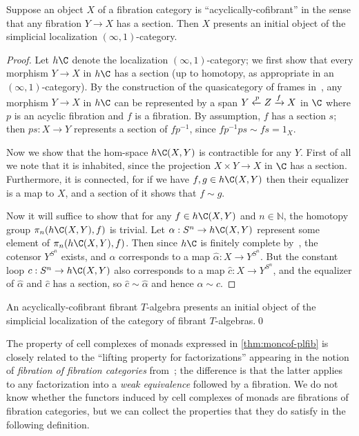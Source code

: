 \documentclass{amsart}
\begin{document}
\begin{lem}
  Suppose an object $X$ of a fibration category is ``acyclically-cofibrant'' in the sense that any fibration $Y\to X$ has a section.
  Then $X$ presents an initial object of the simplicial localization $(\infty,1)$-category.
\end{lem}
\begin{proof}
  Let $h\C$ denote the localization $(\infty,1)$-category; we first show that every morphism $Y\to X$ in $h\C$ has a section (up to homotopy, as appropriate in an $(\infty,1)$-category).
  By the construction of the quasicategory of frames in~\cite{szumilo:cocompl-hoth}, any morphism $Y\to X$ in $h\C$ can be represented by a span $Y \xleftarrow{p} Z\xrightarrow{f} X$ in $\C$ where $p$ is an acyclic fibration and $f$ is a fibration.
  By assumption, $f$ has a section $s$; then $p s : X\to Y$ represents a section of $fp^{-1}$, since $f p^{-1} p s \sim f s = 1_X$.

  Now we show that the hom-space $h\C(X,Y)$ is contractible for any $Y$.
  First of all we note that it is inhabited, since the projection $X\times Y \to X$ in $\C$ has a section.
  Furthermore, it is connected, for if we have $f,g\in h\C(X,Y)$ then their equalizer is a map to $X$, and a section of it shows that $f\sim g$.
  
  Now it will suffice to show that for any $f\in h\C(X,Y)$ and $n\in\mathbb{N}$, the homotopy group $\pi_n(h\C(X,Y),f)$ is trivial.
  Let $\alpha : S^n \to h\C(X,Y)$ represent some element of $\pi_n(h\C(X,Y),f)$.
  Then since $h\C$ is finitely complete by~\cite[Theorem 3.3]{szumilo:cocompl-hoth}, the cotensor $Y^{S^n}$ exists, and $\alpha$ corresponds to a map $\hat{\alpha}:X\to Y^{S^n}$.
  But the constant loop $c:S^n \to h\C(X,Y)$ also corresponds to a map $\hat{c}:X\to Y^{S^n}$, and the equalizer of $\hat{\alpha}$ and $\hat{c}$ has a section, so $\hat{c}\sim\hat{\alpha}$ and hence $\alpha\sim c$.
\end{proof}

\begin{thm}
  An acyclically-cofibrant fibrant $T$-algebra presents an initial object of the simplicial localization of the category of fibrant $T$-algebras.\qed
\end{thm}

The property of cell complexes of monads expressed in \cref{thm:moncof-plfib} is closely related to the ``lifting property for factorizations'' appearing in the notion of \emph{fibration of fibration categories} from~\cite[Definition 1.9]{szumilo:cocompl-hoth}; the difference is that the latter applies to any factorization into a \emph{weak equivalence} followed by a fibration.
We do not know whether the functors induced by cell complexes of monads are fibrations of fibration categories, but we can collect the properties that they do satisfy in the following definition.
\end{document}
